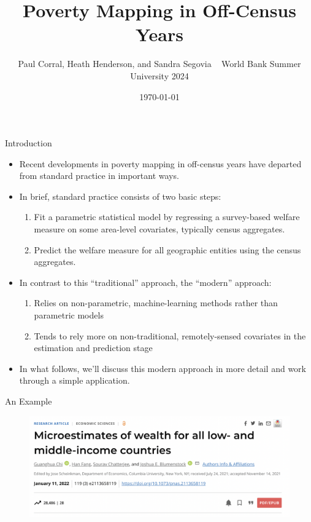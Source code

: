 \documentclass[aspectratio=169, xcolor=dvipsnames]{beamer}
\title[]{Poverty Mapping in Off-Census Years}
\date{\today}
\author[]{Paul Corral, Heath Henderson, and Sandra Segovia \newline
~ \newline
World Bank Summer University 2024}
\begin{document}

\begin{frame}
\titlepage
\end{frame}

\begin{frame}{Introduction}
\begin{itemize}
\item Recent developments in poverty mapping in off-census years have
departed from standard practice in important ways.
\pause
\item In brief, standard practice consists of two basic steps:
\begin{enumerate}
\item Fit a parametric statistical model by regressing a survey-based 
welfare measure on some area-level covariates, typically census aggregates.
\item Predict the welfare measure for all geographic entities using the census
aggregates.
\end{enumerate}
\pause
\item In contrast to this ``traditional'' approach, the ``modern'' approach:
\begin{enumerate}
\item Relies on non-parametric, machine-learning methods rather than 
parametric models
\item Tends to rely more on non-traditional, remotely-sensed covariates in the estimation and
prediction stage
\end{enumerate}
\pause
\item In what follows, we'll discuss this modern approach in more detail and 
work through a simple application.
\end{itemize}
\end{frame}

\begin{frame}{An Example}
\begin{figure}[h!]
  \centering
  \includegraphics[width=0.8 \textwidth]{Chi_1}
\end{figure}
\end{frame}
\end{document}
